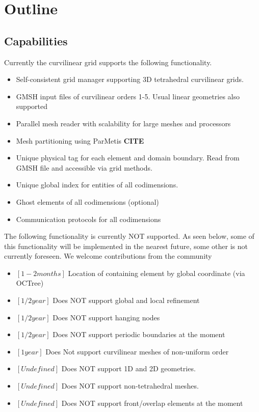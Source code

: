 \section{Outline}
\label{section-outline}

\subsection{Capabilities}
\label{section-outline-capabilities}

\noindent
Currently the curvilinear grid supports the following functionality.
\begin{itemize}
	\item Self-consistent grid manager supporting 3D tetrahedral curvilinear grids.
	\item GMSH input files of curvilinear orders 1-5. Usual linear geometries also supported
	\item Parallel mesh reader with scalability for large meshes and processors
	\item Mesh partitioning using ParMetis \textbf{CITE}
	\item Unique physical tag for each element and domain boundary. Read from GMSH file and accessible via grid methods.
	\item Unique global index for entities of all codimensions.
	\item Ghost elements of all codimensions (optional)
	\item Communication protocols for all codimensions
\end{itemize}

\noindent
The following functionality is currently NOT supported. As seen below, some of this functionality will be implemented in the nearest future, some other is not currently foreseen. We welcome contributions from the community
\begin{itemize}
	\item $[1-2 months]$ Location of containing element by global coordinate (via OCTree)
	\item $[1/2 year]$  Does NOT support global and local refinement
	\item $[1/2 year]$  Does NOT support hanging nodes
	\item $[1/2 year]$  Does NOT support periodic boundaries at the moment
	\item $[1 year]$    Does Not support curvilinear meshes of non-uniform order
	\item $[Undefined]$ Does NOT support 1D and 2D geometries. 
	\item $[Undefined]$ Does NOT support non-tetrahedral meshes.
	\item $[Undefined]$ Does NOT support front/overlap elements at the moment
\end{itemize}

